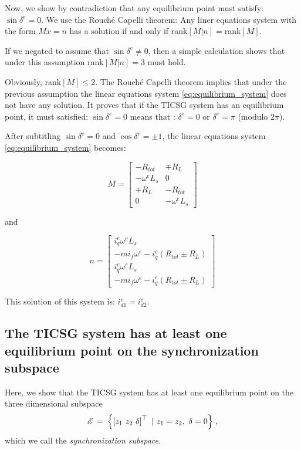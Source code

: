 \documentclass[letterpaper, 10 pt, conference]{ieeeconf}
\newcommand{\m}      {{\hbox{\hskip 1pt}}}
\begin{document}
Now, we  show by contradiction that any equilibrium point must satisfy: $\sin\delta^e=0$.
We use the Rouch\'e Capelli theorem:  Any liner equations system with the form  $Mx=n$ has a  solution if and only if rank$\left[M|n\right]=$rank$\left[M\right].$

If we negated to assume that $\sin\delta^{e}\ne0$, then a simple calculation shows that under this assumption  rank$\left[M|n\right]=3$ must hold.

Obviously, rank$\left[M\right]\le2$.  The Rouch\'e Capelli theorem implies that under the
previous assumption the linear equations system \eqref{eq:equilibrium_system} does not have any solution. It proves that  if the TICSG system has an equilibrium point, it must satisfied: $\sin\delta^{e}=0$ means that : $\delta^{e}=0$ or $\delta^e = \pi$ (modulo $2\pi$).

After subtitling $\sin\delta^{e}=0$
and $\cos\delta^{e}=\pm 1$, the linear equations system  \eqref{eq:equilibrium_system} becomes:

$$
M=\left[\begin{array}{cc}
-R_{tot} & \mp R_{L}\\
-\omega^{e}L_{s} & 0\\
  \mp R_{L} & -R_{tot}\\
0 & -\omega^{e}L_{s}
\end{array}\right]
$$

and 

$$
n=\left[\begin{array}{c}
i_{q}^{e}\omega^{e}L_{s}\\
-mi_{f}\omega^{e}-i_{q}^{e}\left(R_{tot} \pm R_{L}\right)\\
i_{q}^{e}\omega^{e}L_{s}\\
-mi_{f}\omega^{e}-i_{q}^{e}\left(R_{tot} \pm R_{L}\right)
\end{array}\right]
$$

This solution of this system is: $i_{d1}^{e}=i_{d2}^{e}$.



\subsection{The TICSG system has at least one equilibrium point on the synchronization subspace}
Here, we show that the TICSG system has at least one equilibrium point on the three dimensional subspace
\begin{equation} \label{eq:SyncSubspace}
   \mathscr{E} \m=\m \left\{ \left[z_1 \ z_2 \ \delta \right]^\top
   \ |\ z_1=z_2,\ \delta = 0 \right\} \m,
\end{equation}
which we call the \textit{synchronization subspace}.
\end{document}
